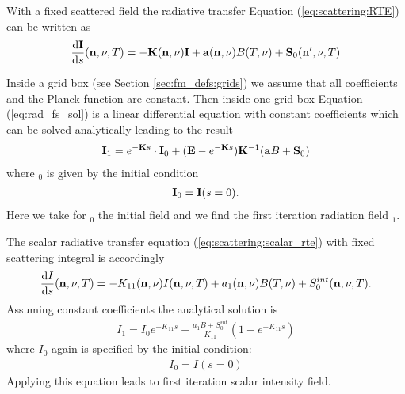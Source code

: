 \label{sec:scattering:RTE}
With a fixed scattered field \ScaInt\DirFre{} the radiative transfer
Equation (\ref{eq:scattering:RTE}) can be written as
\begin{eqnarray}
     \frac{\mathrm{d} {\bf I}}{\mathrm{d} s}({\bf n}, \nu, T) =
     -{\bf K}({\bf n}, \nu){\bf I} + {\bf a}({\bf n}, \nu) B(T, \nu)
     +{\bf S}_0({\bf n}^\prime, \nu, T)
\label{eq:rad_fs_sol}
\end{eqnarray} 

Inside a  grid box (see Section
\ref{sec:fm_defs:grids}) we assume that all
coefficients and the Planck function are constant. Then inside one
grid box Equation (\ref{eq:rad_fs_sol}) is a linear differential
equation with constant coefficients which can be solved analytically
leading to the result  
\begin{eqnarray}
  \label{eq:scattering:RTE_sol}
  {\bf I}_1 = e^{-{\bf K} s}\cdot{\bf I}_0 + ({\bf E} - e^{-{\bf K}
    s}) {\bf K}^{-1} ({\bf a} B + {\bf S}_0)
\end{eqnarray}
where \StoVec$_0$ is given by the initial condition
\begin{eqnarray}
  {\bf I}_0 =  {\bf I}(s = 0).
\end{eqnarray}
Here we take for \StoVec$_0$ the initial field and we find the first
iteration radiation field \StoVec$_1$.

The scalar radiative transfer equation
(\ref{eq:scattering:scalar_rte})  with fixed scattering integral
is accordingly
\begin{eqnarray}
  \label{eq:scattering:scalar_rte_scatint}
\frac{\mathrm{d} I}{\mathrm{d} s} ({\bf n}, \nu, T) = -K_{11}({\bf n}, \nu)I
({\bf n}, \nu, T) + a_1({\bf n}, \nu)B(T,\nu) + S_0^{int}
({\bf n}, \nu, T).
\end{eqnarray} 
Assuming constant coefficients the analytical solution is
\begin{eqnarray}
   \label{eq:scattering:scalar_rte_sol}
I_1 = I_0 e^{-K_{11}s} + \frac{a_1
  B + S_0^{int}}{K_11}\left(1-e^{-K_{11}s}\right)
\end{eqnarray}
where $I_0$ again is specified by the initial condition:
\begin{eqnarray}
  I_0 = I(s=0)
\end{eqnarray}
Applying this equation leads to first iteration scalar intensity
field.  



\label{sec:scattering:conv}

